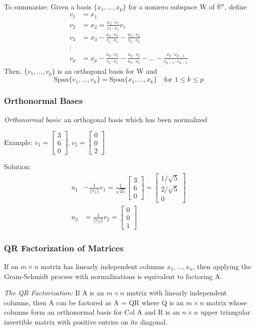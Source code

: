 \documentclass[12pt]{article} %
\newcommand{\R}{\mathbb{R}}
\begin{document}
To summarize:
Given a basis $\{x_1, ..., x_p\}$ for a nonzero subspace W of $\R^n$, define
\begin{align*}
	v_1 &= x_1\\
	v_2 &= x_2 = \frac{x_2 \cdot v_1}{v_1 \cdot v_1} v_1\\
	v_3 &= x_3 - \frac{x_3 \cdot v_1}{v_1 \cdot v_1} - \frac{x_3 \cdot v_2}{v_2 \cdot v_2}\\
	\vdots\\
	v_p &= x_p - \frac{x_p \cdot v_1}{v_1 \cdot v_1} - \frac{x_p \cdot v_2}{v_2 \cdot v_2} - ... - \frac{x_p \cdot v_{p-1}}{v_{p-1} \cdot v_{p-1}}
\end{align*}
Then, $\{v_1, ..., v_p\}$ is an orthogonal basis for W and 
$$\text{Span}\{v_1, ..., v_k\} = \text{Span}\{x_1, ..., x_k\} \quad \text{for } 1 \leq k \leq p$$ 

\subsubsection{Orthonormal Bases}
\emph{Orthonormal basis:} an orthogonal basis which has been normalized

Example: $v_1 = \begin{bmatrix}
	3\\6\\0
\end{bmatrix}, v_2 = \begin{bmatrix}
	0\\0\\2
\end{bmatrix}$

Solution:
\begin{align*}
	u_1 &- \frac{1}{||v_1||}v_1 = \frac{1}{\sqrt{45}}\begin{bmatrix}
		3\\6\\0
	\end{bmatrix} = \begin{bmatrix}
		1/\sqrt{5}\\2/\sqrt{5}\\0
	\end{bmatrix}\\
	u_2 &= \frac{1}{||v_2||}v_2 = \begin{bmatrix}
		0\\0\\1
	\end{bmatrix}
\end{align*}

\subsubsection{QR Factorization of Matrices}
If an $m \times n$ matrix has linearly independent columns $x_1, ..., x_n$, then applying the Gram-Schmidt process with normalizations is equivalent to factoring A.

\emph{The QR Factorization:} If A is an $m \times n$ matrix with linearly independent columns, then A can be factored as A = QR where Q is an $m \times n$ matrix whose columns form an orthonormal basis for Col A and R is an $n \times n$ upper triangular invertible matrix with positive entries on its diagonal.
\end{document}
